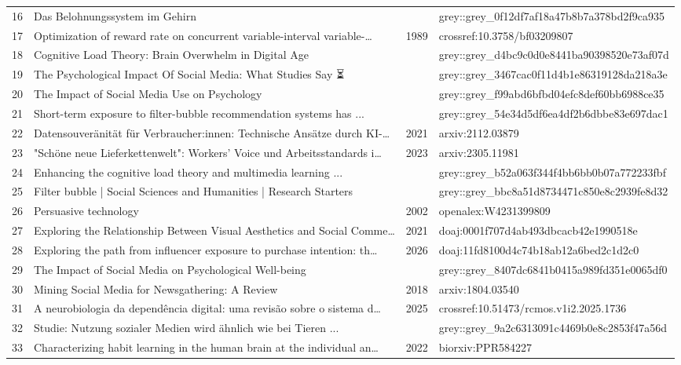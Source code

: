 \documentclass[11pt,a4paper]{article}
\begin{document}
\begin{longtable}{r p{} c p{}}
16 & Das Belohnungssystem im Gehirn &  & grey::grey\_0f12df7af18a47b8b7a378bd2f9ca935 \\
17 & Optimization of reward rate on concurrent variable-interval variable-… & 1989 & crossref:10.3758/bf03209807 \\
18 & Cognitive Load Theory: Brain Overwhelm in Digital Age &  & grey::grey\_d4bc9c0d0e8441ba90398520e73af07d \\
19 & The Psychological Impact Of Social Media: What Studies Say ⏳ &  & grey::grey\_3467cac0f11d4b1e86319128da218a3e \\
20 & The Impact of Social Media Use on Psychology &  & grey::grey\_f99abd6bfbd04efc8def60bb6988ce35 \\
21 & Short-term exposure to filter-bubble recommendation systems has ... &  & grey::grey\_54e34d5df6ea4df2b6dbbe83e697dac1 \\
22 & Datensouveränität für Verbraucher:innen: Technische Ansätze durch KI-… & 2021 & arxiv:2112.03879 \\
23 & "Schöne neue Lieferkettenwelt": Workers' Voice und Arbeitsstandards i… & 2023 & arxiv:2305.11981 \\
24 & Enhancing the cognitive load theory and multimedia learning ... &  & grey::grey\_b52a063f344f4bb6bb0b07a772233fbf \\
25 & Filter bubble | Social Sciences and Humanities | Research Starters &  & grey::grey\_bbc8a51d8734471c850e8c2939fe8d32 \\
26 & Persuasive technology & 2002 & openalex:W4231399809 \\
27 & Exploring the Relationship Between Visual Aesthetics and Social Comme… & 2021 & doaj:0001f707d4ab493dbcacb42e1990518e \\
28 & Exploring the path from influencer exposure to purchase intention: th… & 2026 & doaj:11fd8100d4c74b18ab12a6bed2c1d2c0 \\
29 & The Impact of Social Media on Psychological Well-being &  & grey::grey\_8407dc6841b0415a989fd351e0065df0 \\
30 & Mining Social Media for Newsgathering: A Review & 2018 & arxiv:1804.03540 \\
31 & A neurobiologia da dependência digital: uma revisão sobre o sistema d… & 2025 & crossref:10.51473/rcmos.v1i2.2025.1736 \\
32 & Studie: Nutzung sozialer Medien wird ähnlich wie bei Tieren ... &  & grey::grey\_9a2c6313091c4469b0e8c2853f47a56d \\
33 & Characterizing habit learning in the human brain at the individual an… & 2022 & biorxiv:PPR584227 \\

\end{longtable}
\end{document}
